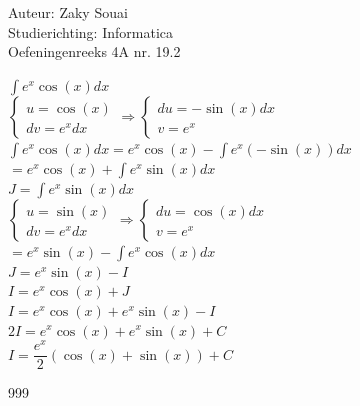 \documentclass[a4paper]{article}
\begin{document}
  
\noindent \large Auteur: Zaky Souai \\
\noindent \large Studierichting:  Informatica\\
\noindent \large Oefeningenreeks 4A nr. 19.2\\

\bigskip

\normalsize

$\displaystyle\int e^x \cos (x) dx$\\

$\left\{\begin{array}{l}
u = \cos (x)\\
dv=e^x dx
\end{array}
\Rightarrow
\left\{\begin{array}{l}
du = - \sin(x) dx\\
v=e^x
\end{array}\right.\right.$\\

$\displaystyle \int e^x\cos(x)dx = e^x\cos (x)- \displaystyle \int e^x(-\sin(x))dx$\\

$= e^x\cos (x)+ \displaystyle \int e^x\sin (x)dx$\\

$J=\displaystyle \int e^x\sin (x)dx$\\

$\left\{\begin{array}{l}
u=\sin (x)\\
dv=e^x dx
\end{array}
\Rightarrow
\left\{\begin{array}{l}
du=\cos (x)dx\\
v=e^x
\end{array}\right.\right.$\\

$=e^x\sin (x)- \displaystyle \int e^x\cos (x)dx$\\

$J=e^x\sin (x)-I$\\

$I=e^x\cos (x)+J$\\

$I=e^x\cos (x)+e^x\sin (x)-I$\\

$2I=e^x\cos (x)+e^x\sin (x) + C$\\

$I=\dfrac{e^x}{2}\left(\cos (x)+\sin (x)\right)+C$


\begin{thebibliography}{999}
\end{thebibliography}
\end{document}
